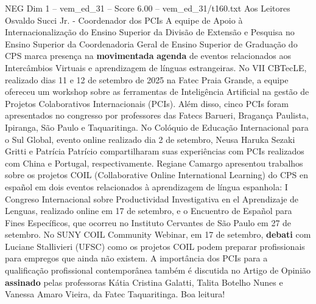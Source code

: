 \begin{textsample}{NEG Dim 1 – vem\_ed\_31 – Score 6.00 – vem\_ed\_31/t160.txt}  \label{ex:f1_neg_148}
Aos Leitores Osvaldo Succi Jr. - Coordenador dos PCIs A equipe de Apoio à Internacionalização do Ensino Superior da Divisão de Extensão e Pesquisa no Ensino Superior da Coordenadoria Geral de Ensino Superior de Graduação do CPS marca presença na \textbf{movimentada} \textbf{agenda} de eventos relacionados aos Intercâmbios Virtuais e aprendizagem de línguas estrangeiras.
No VII CBTecLE, realizado dias 11 e 12 de setembro de 2025 na Fatec Praia Grande, a equipe ofereceu um workshop sobre as ferramentas de Inteligência Artificial na gestão de Projetos Colaborativos Internacionais (PCIs).
Além disso, cinco PCIs foram apresentados no congresso por professores das Fatecs Barueri, Bragança Paulista, Ipiranga, São Paulo e Taquaritinga.
No Colóquio de Educação Internacional para o Sul Global, evento online realizado dia 2 de setembro, Neusa Haruka Sezaki Gritti e Patrícia Patrício compartilharam suas experiências com PCIs realizados com China e Portugal, respectivamente.
Regiane Camargo apresentou trabalhos sobre os projetos COIL (Collaborative Online International Learning) do CPS en español em dois eventos relacionados à aprendizagem de língua espanhola: I Congreso Internacional sobre Productividad Investigativa en el Aprendizaje de Lenguas, realizado online em 17 de setembro, e o Encuentro de Español para Fines Específicos, que ocorreu no Instituto Cervantes de São Paulo em 27 de setembro.
No SUNY COIL Community Webinar, em 17 de setembro, \textbf{debati} com Luciane Stallivieri (UFSC) como os projetos COIL podem preparar profissionais para empregos que ainda não existem.
A importância dos PCIs para a qualificação profissional contemporânea também é discutida no Artigo de Opinião \textbf{assinado} pelas professoras Kátia Cristina Galatti, Talita Botelho Nunes e Vanessa Amaro Vieira, da Fatec Taquaritinga.
Boa leitura!

\end{textsample}
